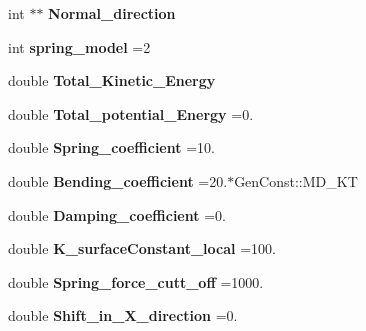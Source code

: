 \begin{DoxyCompactItemize}
\item 
int $\ast$$\ast$ {\bfseries Normal\+\_\+direction}\hypertarget{classMembrane_aacb12cbcff4d9068cc3ec4edc1525fbd}{}\label{classMembrane_aacb12cbcff4d9068cc3ec4edc1525fbd}

\item 
int {\bfseries spring\+\_\+model} =2\hypertarget{classMembrane_abda57a1da212a2a1fc36e0faa5e6baf4}{}\label{classMembrane_abda57a1da212a2a1fc36e0faa5e6baf4}

\item 
double {\bfseries Total\+\_\+\+Kinetic\+\_\+\+Energy}\hypertarget{classMembrane_ace96624cf2fada1f08fc9c17ce2e1051}{}\label{classMembrane_ace96624cf2fada1f08fc9c17ce2e1051}

\item 
double {\bfseries Total\+\_\+potential\+\_\+\+Energy} =0.\hypertarget{classMembrane_a44386c31326522dc000f7d88edde2c4b}{}\label{classMembrane_a44386c31326522dc000f7d88edde2c4b}

\item 
double {\bfseries Spring\+\_\+coefficient} =10.\hypertarget{classMembrane_a51536477e359a874919d08dc7a97c7fa}{}\label{classMembrane_a51536477e359a874919d08dc7a97c7fa}

\item 
double {\bfseries Bending\+\_\+coefficient} =20.$\ast$Gen\+Const\+::\+M\+D\+\_\+\+KT\hypertarget{classMembrane_a25001dd440e0d8631a7191b3750f4188}{}\label{classMembrane_a25001dd440e0d8631a7191b3750f4188}

\item 
double {\bfseries Damping\+\_\+coefficient} =0.\hypertarget{classMembrane_a673f0965635a8b716ffe7b1569550fe7}{}\label{classMembrane_a673f0965635a8b716ffe7b1569550fe7}

\item 
double {\bfseries K\+\_\+surface\+Constant\+\_\+local} =100.\hypertarget{classMembrane_a9d4d4fc012f1c7cec680d64c1b287726}{}\label{classMembrane_a9d4d4fc012f1c7cec680d64c1b287726}

\item 
double {\bfseries Spring\+\_\+force\+\_\+cutt\+\_\+off} =1000.\hypertarget{classMembrane_aa83ec44fdb8de36286e6f4b35af460f3}{}\label{classMembrane_aa83ec44fdb8de36286e6f4b35af460f3}

\item 
double {\bfseries Shift\+\_\+in\+\_\+\+X\+\_\+direction} =0.\hypertarget{classMembrane_a3c9d4f24bc0e38e0a18aeb771e3d4386}{}\label{classMembrane_a3c9d4f24bc0e38e0a18aeb771e3d4386}


\end{DoxyCompactItemize}
